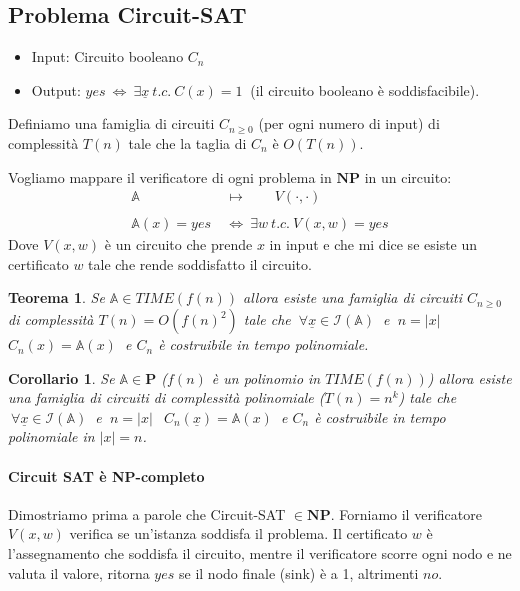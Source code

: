 \documentclass[a4paper]{article}
\newtheorem{thm}{Teorema}[subsection]
\newtheorem{coroll}{Corollario}[subsection]
\theoremstyle{definition}
\newcommand{\p}{\mathbf{P}}
\newcommand{\np}{\mathbf{NP}}
\newcommand{\prob}[1]{\mathbb{#1}}
\newcommand{\instance}[1]{\mathcal{I}(\prob{#1})}
\begin{document}
	\subsection{Problema Circuit-SAT}
		\begin{itemize}
			\item Input: Circuito booleano $ C_n $
			\item Output: $ yes \ \Leftrightarrow \ \exists \underline{x} \ t.c. \ C(x) = 1 \ $ (il circuito booleano è soddisfacibile).
		\end{itemize}
		Definiamo una famiglia di circuiti $ C_{n\geq 0} $ (per ogni numero di input) di complessità $ T(n) $ tale che la taglia di $ C_n $ è $ O(T(n)) $.
		
		Vogliamo mappare il verificatore di ogni problema in $ \np $ in un circuito:
		\begin{align*}
			\prob{A} \qquad &\longmapsto \qquad V(\cdot, \cdot)\\ \\
			\prob{A}(x) = yes\ &\Leftrightarrow\ \exists w \ t.c.\ V(x, w) = yes
		\end{align*}
		Dove $ V(x, w) $ è un circuito che prende $ x $ in input e che mi dice se esiste un certificato $ w $ tale che rende soddisfatto il circuito.
		
		\begin{thm}
			\label{thm:circfam}
			Se $ \prob{A} \in TIME(f(n)) $ allora esiste una famiglia di circuiti $ C_{n\geq 0} $ di complessità $ T(n) = O(f(n)^2) $ tale che $ \ \forall \underline{x} \in \instance{A}\ $ e $ \ n = \vert x \vert\ $ $ C_n(x) = \prob{A}(x)\ $ e $ C_n $ è costruibile in tempo polinomiale.
		\end{thm}
		
		\begin{coroll}
			Se $ \prob{A} \in \p $ ($ f(n) $ è un polinomio in $ TIME(f(n)) $) allora esiste una famiglia di circuiti di complessità polinomiale ($ T(n) = n^k $) tale che $ \ \forall\underline{x} \in \instance{A} \ $ e $ \ n = \vert x \vert \ \ $ $ C_n(\underline{x}) = \prob{A}(x) \ $ e $ C_n $ è costruibile in tempo polinomiale in $ \vert x \vert = n $. 
		\end{coroll}
		
		\paragraph{Circuit SAT è NP-completo} Dimostriamo prima a parole che Circuit-SAT $ \in \np $. Forniamo il verificatore $ V(x,w) $ verifica se un'istanza soddisfa il problema. Il certificato $ w $ è l'assegnamento che soddisfa il circuito, mentre il verificatore scorre ogni nodo e ne valuta il valore, ritorna $ yes $ se il nodo finale (sink) è a 1, altrimenti $ no $.
		
\end{document}
